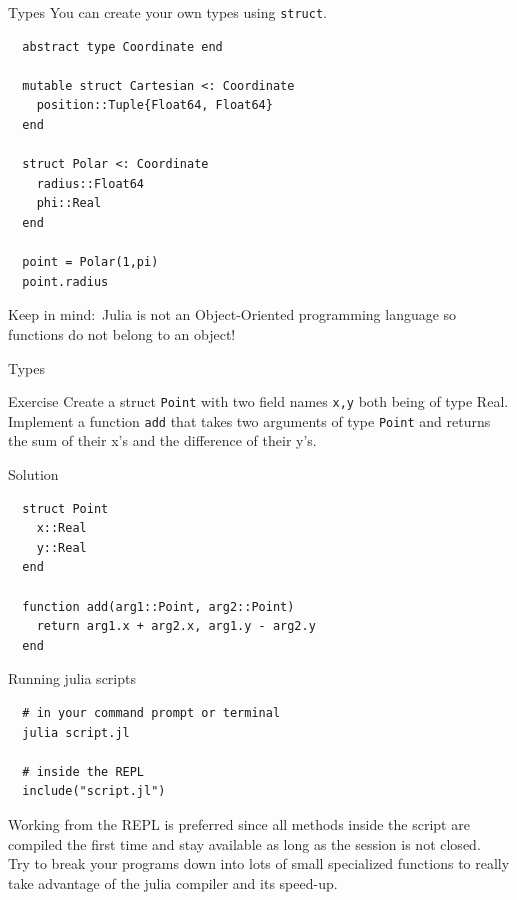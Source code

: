 \documentclass{beamer}
\begin{document}
\begin{frame}[fragile]{Types}
 You can create your own types using \verb|struct|.
  \begin{lstlisting}
  abstract type Coordinate end
  
  mutable struct Cartesian <: Coordinate
    position::Tuple{Float64, Float64}
  end
  
  struct Polar <: Coordinate
    radius::Float64
    phi::Real
  end
  
  point = Polar(1,pi)
  point.radius
  \end{lstlisting}
Keep in mind:~Julia is not an Object-Oriented programming language so functions do not belong to an object!
\end{frame}

\begin{frame}[fragile]{Types}
	\begin{block}{Exercise}
		Create a struct \verb|Point| with two field names \verb|x,y| both being of type Real. Implement a function \verb|add| that takes two arguments of type \verb|Point| and returns the sum of their x's and the difference of their y's.
	\end{block}
	\vfill
	\begin{block}{Solution}
		\begin{lstlisting}
  struct Point
    x::Real
    y::Real
  end
  
  function add(arg1::Point, arg2::Point)
    return arg1.x + arg2.x, arg1.y - arg2.y
  end
		\end{lstlisting}
	\end{block}
\end{frame}



\begin{frame}[fragile]{Running julia scripts}
 \begin{lstlisting}
  # in your command prompt or terminal
  julia script.jl
  
  # inside the REPL
  include("script.jl")
\end{lstlisting}
Working from the REPL is preferred since all methods inside the script are compiled the first time and stay available as long as the session is not closed.\\

\vspace{4mm}
Try to break your programs down into lots of small specialized functions to really take advantage of the julia compiler and its speed-up.
\end{frame}
\end{document}
